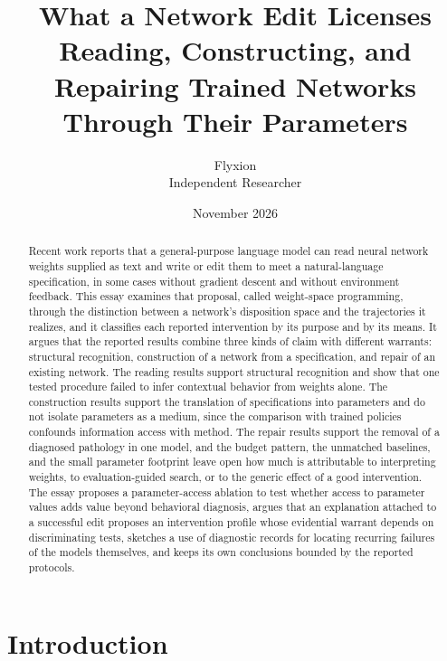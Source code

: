 \documentclass[11pt]{article}
\title{What a Network Edit Licenses\\[0.4em]\large Reading, Constructing, and Repairing Trained Networks Through Their Parameters}
\author{Flyxion\\Independent Researcher}
\date{November 2026}
\begin{document}
\maketitle

\begin{abstract}
\noindent Recent work reports that a general-purpose language model can read neural network weights supplied as text and write or edit them to meet a natural-language specification, in some cases without gradient descent and without environment feedback. This essay examines that proposal, called weight-space programming, through the distinction between a network's disposition space and the trajectories it realizes, and it classifies each reported intervention by its purpose and by its means. It argues that the reported results combine three kinds of claim with different warrants: structural recognition, construction of a network from a specification, and repair of an existing network. The reading results support structural recognition and show that one tested procedure failed to infer contextual behavior from weights alone. The construction results support the translation of specifications into parameters and do not isolate parameters as a medium, since the comparison with trained policies confounds information access with method. The repair results support the removal of a diagnosed pathology in one model, and the budget pattern, the unmatched baselines, and the small parameter footprint leave open how much is attributable to interpreting weights, to evaluation-guided search, or to the generic effect of a good intervention. The essay proposes a parameter-access ablation to test whether access to parameter values adds value beyond behavioral diagnosis, argues that an explanation attached to a successful edit proposes an intervention profile whose evidential warrant depends on discriminating tests, sketches a use of diagnostic records for locating recurring failures of the models themselves, and keeps its own conclusions bounded by the reported protocols.
\end{abstract}

\newpage

\section{Introduction}
\end{document}
